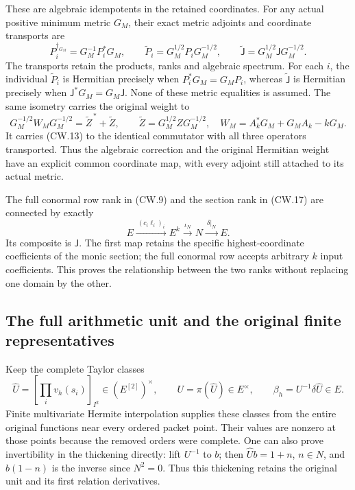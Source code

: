 These are algebraic idempotents in the retained coordinates.
For any actual positive minimum metric \(G_M\), their exact
metric adjoints and coordinate transports are
\[
 P_i^{\dagger_{G_M}}=G_M^{-1}P_i^*G_M,\qquad
 \widetilde P_i=G_M^{1/2}P_iG_M^{-1/2},\qquad
 \widetilde{\mathsf J}=G_M^{1/2}\mathsf JG_M^{-1/2}.
 \tag{CW.20}
\]
The transports retain the products, ranks and algebraic spectrum.
For each \(i\), the individual \(\widetilde P_i\) is Hermitian
precisely when \(P_i^*G_M=G_MP_i\), whereas
\(\widetilde{\mathsf J}\) is Hermitian precisely when
\(\mathsf J^*G_M=G_M\mathsf J\).  None of these metric
equalities is assumed.
The same isometry carries the original weight to
\[
 G_M^{-1/2}W_MG_M^{-1/2}
    =\widetilde Z^{\,*}+\widetilde Z,\qquad
 \widetilde Z=G_M^{1/2}ZG_M^{-1/2},
 \quad W_M=A_k^*G_M+G_MA_k-kG_M .
 \tag{CW.21}
\]
It carries (CW.13) to the identical commutator with all three
operators transported.  Thus the algebraic correction and the
original Hermitian weight have an explicit common coordinate
map, with every adjoint still attached to its actual metric.

The full conormal row rank in (CW.9) and the section rank in
(CW.17) are connected by exactly
\[
 E\xrightarrow{\ (c_i\ell_i)_i\ }E^k
   \xrightarrow{\ \iota_N\ }N
   \xrightarrow{\ \delta|_N\ }E.
 \tag{CW.22}
\]
Its composite is \(\mathsf J\).
The first map retains the specific highest-coordinate
coefficients of the monic section; the full conormal row
accepts arbitrary \(k\) input coefficients.
This proves the relationship between the two ranks without
replacing one domain by the other.

\subsection{The full arithmetic unit and the original finite representatives}

Keep the complete Taylor classes
\[
 \widehat U=\left[\prod_i v_h(s_i)\right]_{I^2}\in(E^{[2]})^\times,
 \qquad U=\pi(\widehat U)\in E^\times,\qquad
 \beta_h=U^{-1}\delta\widehat U\in E.
 \tag{CW.23}
\]
Finite multivariate Hermite interpolation supplies these classes
from the entire original functions near every ordered packet
point.  Their values are nonzero at those points because the
removed orders were complete.  One can also prove invertibility
in the thickening directly: lift \(U^{-1}\) to \(b\); then
\(\widehat Ub=1+n\), \(n\in N\), and \(b(1-n)\) is the
inverse since \(N^2=0\).
Thus this thickening retains the original unit and its first
relation derivatives.

